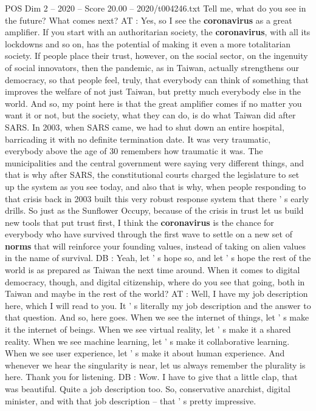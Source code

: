\begin{textsample}{POS Dim 2 – 2020 – Score 20.00 – 2020/t004246.txt}
Tell me, what do you see in the future?
What comes next?
AT : Yes, so I see the \textbf{coronavirus} as a great amplifier.
If you start with an authoritarian society, the \textbf{coronavirus}, with all its lockdowns and so on, has the potential of making it even a more totalitarian society.
If people place their trust, however, on the social sector, on the ingenuity of social innovators, then the pandemic, as in Taiwan, actually strengthens our democracy, so that people feel, truly, that everybody can think of something that improves the welfare of not just Taiwan, but pretty much everybody else in the world.
And so, my point here is that the great amplifier comes if no matter you want it or not, but the society, what they can do, is do what Taiwan did after SARS.
In 2003, when SARS came, we had to shut down an entire hospital, barricading it with no definite termination date.
It was very traumatic, everybody above the age of 30 remembers how traumatic it was.
The municipalities and the central government were saying very different things, and that is why after SARS, the constitutional courts charged the legislature to set up the system as you see today, and also that is why, when people responding to that crisis back in 2003 built this very robust response system that there ' s early drills.
So just as the Sunflower Occupy, because of the crisis in trust let us build new tools that put trust first, I think the \textbf{coronavirus} is the chance for everybody who have survived through the first wave to settle on a new set of \textbf{norms} that will reinforce your founding values, instead of taking on alien values in the name of survival.
DB : Yeah, let ' s hope so, and let ' s hope the rest of the world is as prepared as Taiwan the next time around.
When it comes to digital democracy, though, and digital citizenship, where do you see that going, both in Taiwan and maybe in the rest of the world?
AT : Well, I have my job description here, which I will read to you.
It ' s literally my job description and the answer to that question.
And so, here goes.
When we see the internet of things, let ' s make it the internet of beings.
When we see virtual reality, let ' s make it a shared reality.
When we see machine learning, let ' s make it collaborative learning.
When we see user experience, let ' s make it about human experience.
And whenever we hear the singularity is near, let us always remember the plurality is here.
Thank you for listening.
DB : Wow.
I have to give that a little clap, that was beautiful.
Quite a job description too.
So, conservative anarchist, digital minister, and with that job description -- that ' s pretty impressive.

\end{textsample}
